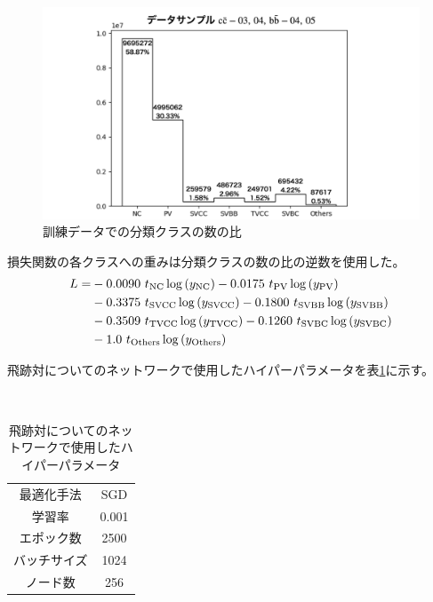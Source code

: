 \begin{figure}[htbp]
 \centering
 \includegraphics[width=1.0\textwidth]{Figure/3Networks/3-3-2-2ImbalancedData.png}
 \caption{訓練データでの分類クラスの数の比}
 \label{3-3-2-2ImbalancedData}
\end{figure}

損失関数の各クラスへの重みは分類クラスの数の比の逆数を使用した。
\begin{equation}
 \begin{split}
 L = & - 0.0090\  t_{\rm NC} \log{(y_{\rm NC})} - 0.0175\  t_{\rm PV} \log{(y_{\rm PV})} \\
       & - 0.3375\  t_{\rm SVCC} \log{(y_{\rm SVCC})} - 0.1800\  t_{\rm SVBB} \log{(y_{\rm SVBB})}\\
       & - 0.3509\  t_{\rm TVCC} \log{(y_{\rm TVCC})} - 0.1260\  t_{\rm SVBC} \log{(y_{\rm SVBC})}\\
       & - 1.0\  t_{\rm Others} \log{(y_{\rm Others})}\\
 \end{split}
\end{equation}

飛跡対についてのネットワークで使用したハイパーパラメータを表\ref{HyperparametersforPairModel}に示す。

\begin{table}[htb]
 \centering
　\small
  \begin{tabular}{c c}\hline
    最適化手法 & SGD\\
    学習率 & 0.001\\
    エポック数 & 2500\\
    バッチサイズ & 1024\\
    ノード数 & 256\\ \hline
  \end{tabular}
  \caption{飛跡対についてのネットワークで使用したハイパーパラメータ}
  \label{HyperparametersforPairModel}
\end{table}

